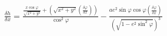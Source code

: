 \documentclass{standalone}
\begin{document}
    $\frac{\delta h}{\delta x} = \frac{\frac{x{\cos\varphi}}{\sqrt{x^2+y^2}} + (\sqrt{x^2+y^2} (\frac{\delta\varphi}{\delta x}))}{\cos^2 \varphi} - \frac{ a e^2 {\sin \varphi}{\cos \varphi} (\frac{\delta \varphi}{\delta x})}{ ( \sqrt{1 - e^2 {\sin^2 \varphi} } )^3 }$
\end{document}
